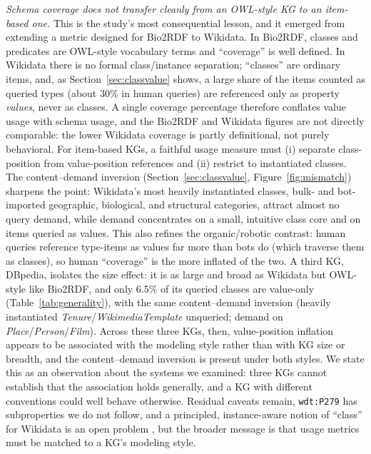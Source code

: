 \documentclass[sw]{iosart2x}
\begin{document}
\emph{Schema coverage does not transfer cleanly from an OWL-style KG to an item-based one.}
This is the study's most consequential lesson, and it emerged from extending a metric
designed for Bio2RDF to Wikidata. In Bio2RDF, classes and predicates are OWL-style
vocabulary terms and ``coverage'' is well defined. In Wikidata there is no formal
class/instance separation; ``classes'' are ordinary items, and, as Section~\ref{sec:classvalue}
shows, a large share of the items counted as queried types (about 30\% in human
queries) are referenced only as property \emph{values}, never as classes. A single
coverage percentage therefore conflates value usage with schema usage, and the Bio2RDF
and Wikidata figures are not directly comparable: the lower Wikidata coverage is partly
definitional, not purely behavioral. For item-based KGs, a faithful usage measure must
(i) separate class-position from value-position references and (ii) restrict to
instantiated classes. The content--demand inversion (Section~\ref{sec:classvalue}, Figure~\ref{fig:mismatch})
sharpens the point: Wikidata's most heavily instantiated classes, bulk- and
bot-imported geographic, biological, and structural categories, attract almost no
query demand, while demand concentrates on a small, intuitive class core and on items
queried as values. This also refines the organic/robotic contrast: human queries reference
type-items as values far more than bots do (which traverse them as classes), so human
``coverage'' is the more inflated of the two. A third KG, DBpedia, isolates the size effect:
it is as large and broad as Wikidata but OWL-style like Bio2RDF, and only 6.5\% of its
queried classes are value-only (Table~\ref{tab:generality}), with the same content--demand
inversion (heavily instantiated \emph{Tenure}/\emph{WikimediaTemplate} unqueried; demand on
\emph{Place}/\emph{Person}/\emph{Film}). Across these three KGs, then, value-position inflation
appears to be associated with the modeling style rather than with KG size or breadth, and the
content--demand inversion is present under both styles. We state this as an observation about
the systems we examined: three KGs cannot establish that the association holds generally, and
a KG with different conventions could well behave otherwise.
Residual caveats remain, \texttt{wdt:P279}
has subproperties we do not follow, and a principled, instance-aware notion of ``class''
for Wikidata is an open problem \cite{brasileiro2016applying,piscopo2018who,patelschneider2024class}, but the broader message is that usage metrics must be matched to a KG's modeling style.
\end{document}

